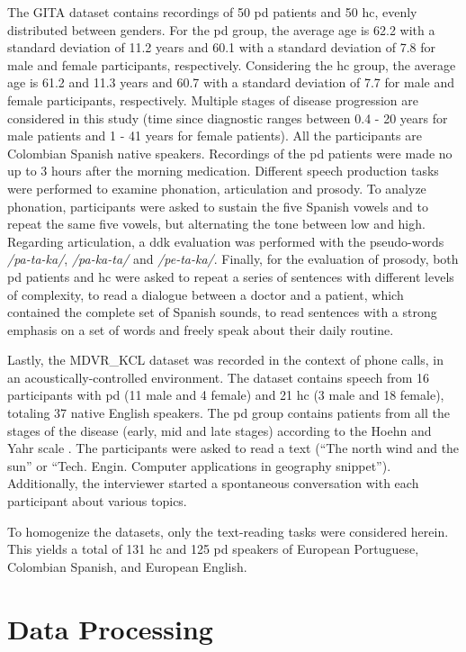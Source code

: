 The GITA dataset contains recordings of 50 \gls{pd} patients and 50 \gls{hc}, evenly distributed between genders. For the \gls{pd} group, the average age is 62.2 with a standard deviation of 11.2 years and 60.1 with a standard deviation of 7.8 for male and female participants, respectively. Considering the \gls{hc} group, the average age is 61.2 and 11.3 years and 60.7 with a standard deviation of 7.7 for male and female participants, respectively. Multiple stages of disease progression are considered in this study (time since diagnostic ranges between 0.4 - 20 years for male patients and 1 - 41 years for female patients). All the participants are Colombian Spanish native speakers. Recordings of the \gls{pd} patients were made no up to 3 hours after the morning medication. Different speech production tasks were performed to examine phonation, articulation and prosody. To analyze phonation, participants were asked to sustain the five Spanish vowels and to repeat the same five vowels, but alternating the tone between low and high. Regarding articulation, a \gls{ddk} evaluation was performed with the pseudo-words \textit{/pa-ta-ka/}, \textit{/pa-ka-ta/} and \textit{/pe-ta-ka/}. Finally, for the evaluation of prosody, both \gls{pd} patients and \gls{hc} were asked to repeat a series of sentences with different levels of complexity, to read a dialogue between a doctor and a patient, which contained the complete set of Spanish sounds, to read sentences with a strong emphasis on a set of words and freely speak about their daily routine.

Lastly, the MDVR\_KCL dataset was recorded in the context of phone calls, in an acoustically-controlled environment. The dataset contains speech from 16 participants with \gls{pd} (11 male and 4 female) and 21 \gls{hc} (3 male and 18 female), totaling 37 native English speakers. The \gls{pd} group contains patients from all the stages of the disease (early, mid and late stages) according to the  Hoehn and Yahr scale \cite{hoehn_yahr}. The participants were asked to read a text (``The north wind and the sun'' or ``Tech. Engin. Computer applications in geography snippet''). Additionally, the interviewer started a spontaneous conversation with each participant about various topics.

To homogenize the datasets, only the text-reading tasks were considered herein. This yields a total of 131 \gls{hc} and 125 \gls{pd} speakers of European Portuguese, Colombian Spanish, and European English. 

\section{Data Processing}

